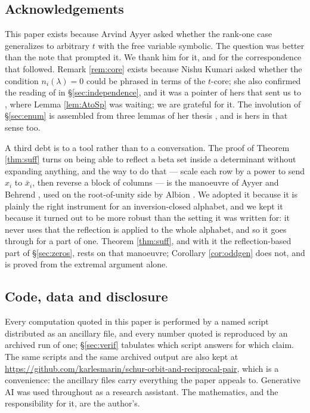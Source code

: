 \documentclass[11pt,reqno]{amsart}
\theoremstyle{plain}
\theoremstyle{definition}
\begin{document}
\subsection*{Acknowledgements}
This paper exists because Arvind Ayyer asked whether the rank-one case generalizes to arbitrary $t$
with the free variable symbolic. The question was better than the note that prompted it. We thank him
for it, and for the correspondence that followed. Remark \ref{rem:core} exists because Nishu Kumari
asked whether the condition $n_i(\lambda)=0$ could be phrased in terms of the $t$-core; she also
confirmed the reading of \cite[Theorem 5.3]{AK25} in \S\ref{sec:independence}, and it was a pointer
of hers that sent us to \cite[\S3]{AK25}, where Lemma \ref{lem:AtoSp} was waiting; we are grateful
for it. The involution of \S\ref{sec:enum} is assembled from three lemmas of her thesis
\cite{KumariThesis}, and is hers in that sense too.

A third debt is to a tool rather than to a conversation. The proof of Theorem \ref{thm:suff} turns
on being able to reflect a beta set inside a determinant without expanding anything, and the way to
do that --- scale each row by a power to send $x_i$ to $\bar x_i$, then reverse a block of columns
--- is the manoeuvre of Ayyer and Behrend \cite[\S3]{AB19}, used on the root-of-unity side by Albion
\cite{Alb23,Alb25}. We adopted it because it is plainly the right instrument for an inversion-closed
alphabet, and we kept it because it turned out to be more robust than the setting it was written
for: it never uses that the reflection is applied to the whole alphabet, and so it goes through for
a part of one. Theorem \ref{thm:suff}, and with it the reflection-based part of
\S\ref{sec:zeros}, rests on that manoeuvre; Corollary \ref{cor:oddgen} does not, and is
proved from the extremal argument alone.

\subsection*{Code, data and disclosure}\label{sec:disclosure}\label{sec:disclosure}
Every computation quoted in this paper is performed by a named script distributed as an ancillary
file, and every number quoted is reproduced by an archived run of one; \S\ref{sec:verif} tabulates
which script answers for which claim. The same scripts and the same archived output are also kept at
\url{https://github.com/karlesmarin/schur-orbit-and-reciprocal-pair}, which is a convenience: the
ancillary files carry everything the paper appeals to. Generative AI was used throughout as a
research assistant. The mathematics, and the responsibility for it, are the author's.
\end{document}
